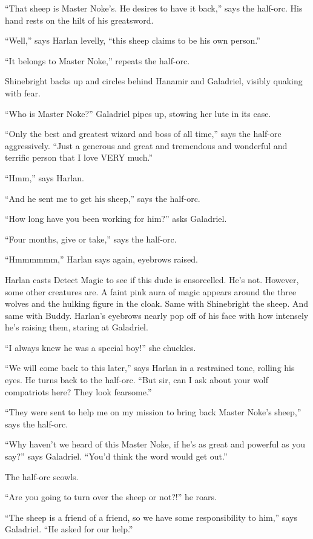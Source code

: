 \documentclass[smalldemyvopaper,11pt,twoside,onecolumn,openright,extrafontsizes]{memoir}
\begin{document}
``That sheep is Master Noke's. He desires to have it back,'' says the
half-orc. His hand rests on the hilt of his greatsword.

``Well,'' says Harlan levelly, ``this sheep claims to be his own
person.''

``It belongs to Master Noke,'' repeats the half-orc.

Shinebright backs up and circles behind Hanamir and Galadriel, visibly
quaking with fear.

``Who is Master Noke?'' Galadriel pipes up, stowing her lute in its
case.

``Only the best and greatest wizard and boss of all time,'' says the
half-orc aggressively. ``Just a generous and great and tremendous and
wonderful and terrific person that I love VERY much.''

``Hmm,'' says Harlan.

``And he sent me to get his sheep,'' says the half-orc.

``How long have you been working for him?'' asks Galadriel.

``Four months, give or take,'' says the half-orc.

``Hmmmmmm,'' Harlan says again, eyebrows raised.

Harlan casts Detect Magic to see if this dude is ensorcelled. He's not.
However, some other creatures are. A faint pink aura of magic appears
around the three wolves and the hulking figure in the cloak. Same with
Shinebright the sheep. And same with Buddy. Harlan's eyebrows nearly pop
off of his face with how intensely he's raising them, staring at
Galadriel.

``I always knew he was a special boy!'' she chuckles.

``We will come back to this later,'' says Harlan in a restrained tone,
rolling his eyes. He turns back to the half-orc. ``But sir, can I ask
about your wolf compatriots here? They look fearsome.''

``They were sent to help me on my mission to bring back Master Noke's
sheep,'' says the half-orc.

``Why haven't we heard of this Master Noke, if he's as great and
powerful as you say?'' says Galadriel. ``You'd think the word would get
out.''

The half-orc scowls.

``Are you going to turn over the sheep or not?!'' he roars.

``The sheep is a friend of a friend, so we have some responsibility to
him,'' says Galadriel. ``He asked for our help.''
\end{document}
